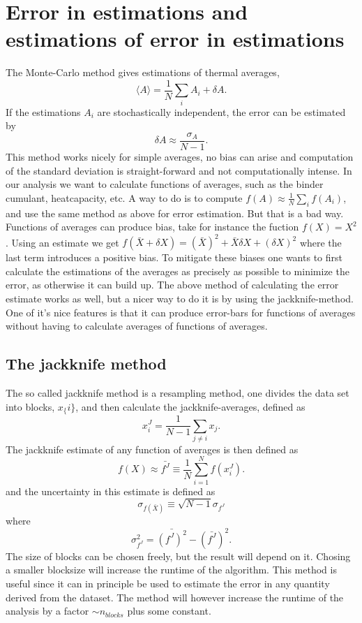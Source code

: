 \section{Error in estimations and estimations of error in estimations}
The Monte-Carlo method gives estimations of thermal averages,
\begin{equation}
  \langle A \rangle = \frac{1}{N}\sum_i A_i +\delta A.
  \label{}
\end{equation}
If the estimations $A_i$ are stochastically independent, the error can be estimated by
\begin{equation}
  \delta A \approx \frac{\sigma_A}{N-1}.
  \label{}
\end{equation}
This method works nicely for simple averages, no bias can arise and computation of the standard deviation is straight-forward and not computationally intense.
In our analysis we want to calculate functions of averages, such as the binder cumulant, heatcapacity, etc.
A way to do is to compute
$f(A) \approx \frac{1}{N}\sum_i f(A_i)$, and use the same method as above for error estimation.
But that is a bad way.
Functions of averages can produce bias, take for instance the fuction $f(X) = X^2$. Using an estimate  we get $ f(\bar{X} + \delta X) = (\bar{X})^2 + \bar{X}\delta X + (\delta X)^2$ where the last term introduces a positive bias.
To mitigate these biases one wants to first calculate the estimations of the averages as precisely as possible to minimize the error, as otherwise it can build up.
The above method of calculating the error estimate works as well, but a nicer way to do it is by using the jackknife-method.
One of it's nice features is that it can produce error-bars for functions of averages without having to calculate averages of functions of averages.
\subsection{The jackknife method}
The so called jackknife method is a resampling method, one divides the data set into blocks, $x_\{i\}$, and then calculate the jackknife-averages, defined as 
\begin{equation}
  x_i^J = \frac{1}{N-1}\sum_{j\neq i}x_j.
\end{equation}
The jackknife estimate of any function of averages is then defined as 
\begin{equation}
  f(X)\approx \bar{f^J}\equiv \frac{1}{N}\sum_{i=1}^{N} f(x_i^J).
  \label{}
\end{equation}
and the uncertainty in this estimate is defined as 
\begin{equation}
  \sigma_{f(\bar{X})} \equiv \sqrt{N-1}\sigma_{f^J}
\end{equation}
where
\begin{equation}
  \sigma^2_{f^J} = \bar{(f^J)^2} - (\bar{f^J})^2.
  \label{}
\end{equation}
The size of blocks can be chosen freely, but the result will depend on it.
Chosing a smaller blocksize will increase the runtime of the algorithm.
This method is useful since it can in principle be used to estimate the error in any quantity derived from the dataset.
The method will however increase the runtime of the analysis by a factor $\sim n_{blocks}$ plus some constant.

